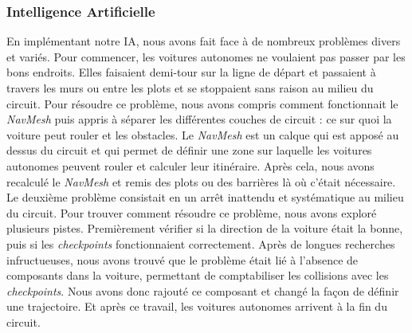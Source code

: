 \documentclass[12pt,a4paper]{article}
\newcommand{\AI}{Intelligence Artificielle}
\begin{document}
            \subsubsection{\AI}
                En implémentant notre IA, nous avons fait face à de nombreux problèmes divers et variés. Pour 
                commencer, les voitures autonomes ne voulaient pas passer par les bons endroits. Elles 
                faisaient demi-tour sur la ligne de départ et passaient à travers les murs ou entre les 
                plots et se stoppaient sans raison au milieu du circuit. Pour résoudre ce problème, nous
                avons compris comment fonctionnait le \textit{NavMesh} puis appris à séparer les 
                différentes couches de circuit : ce sur quoi la voiture peut rouler et les obstacles. Le 
                \textit{NavMesh} est un calque qui est apposé au dessus du circuit et qui permet de
                définir une zone sur laquelle les voitures autonomes peuvent rouler et calculer leur
                itinéraire. Après cela, nous avons recalculé le \textit{NavMesh} et remis des plots
                ou des barrières là où c'était nécessaire.\\
                Le deuxième problème consistait en un arrêt inattendu et systématique au milieu du 
                circuit. Pour trouver comment résoudre ce problème, nous avons exploré plusieurs pistes. Premièrement vérifier si la direction de la voiture était la bonne, puis si les 
                \textit{checkpoints} fonctionnaient correctement. Après de longues recherches 
                infructueuses, nous avons trouvé que le problème était lié à l'absence de composants 
                dans la voiture, permettant de comptabiliser les collisions avec les 
                \textit{checkpoints}. Nous avons donc rajouté ce composant et changé la façon de définir
                une trajectoire. Et après ce travail, les voitures autonomes arrivent à la fin du 
                circuit.
\end{document}
